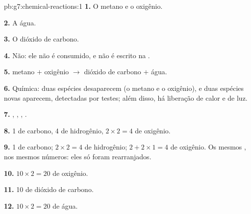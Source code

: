 \begin{solution}{pb:g7:chemical-reactions:1}
\textbf{1.} O metano e o oxigênio.

\textbf{2.} A água.

\textbf{3.} O dióxido de carbono.

\textbf{4.} Não: ele não é consumido, e não é escrito na .

\textbf{5.} metano $+$ oxigênio $\longrightarrow$ dióxido de carbono $+$
água.

\textbf{6.} Química: duas espécies desaparecem (o metano e o oxigênio),
e duas espécies novas aparecem, detectadas por testes; além disso, há
liberação de calor e de luz.

\textbf{7.} , , , .

\textbf{8.} 1 de carbono, 4 de hidrogênio, $2 \times 2 = 4$ de oxigênio.

\textbf{9.} 1 de carbono; $2 \times 2 = 4$ de hidrogênio;
$2 + 2 \times 1 = 4$ de oxigênio. Os mesmos , nos mesmos números: eles só foram
rearranjados.

\textbf{10.} $10 \times 2 = 20$  de oxigênio.

\textbf{11.} 10  de dióxido de carbono.

\textbf{12.} $10 \times 2 = 20$  de água.
\end{solution}
